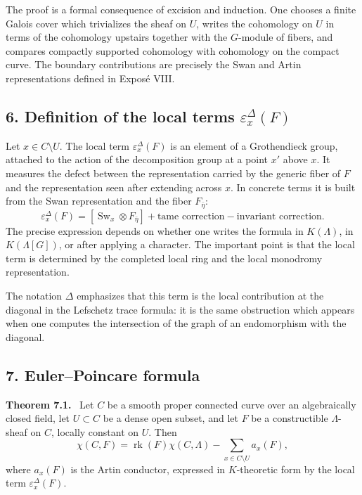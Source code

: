 \documentclass[14pt]{extarticle}
\newcommand{\Sw}{\operatorname{Sw}}
\newenvironment{statement}[1]{\par\medskip\noindent\textbf{#1.}\ }{\par\medskip}
\begin{document}
The proof is a formal consequence of excision and induction. One chooses a finite Galois cover which trivializes the sheaf on $U$, writes the cohomology on $U$ in terms of the cohomology upstairs together with the $G$-module of fibers, and compares compactly supported cohomology with cohomology on the compact curve. The boundary contributions are precisely the Swan and Artin representations defined in Expos\'e VIII.

\subsection*{6. Definition of the local terms $\varepsilon_x^\Delta(F)$}

Let $x\in C\setminus U$. The local term $\varepsilon_x^\Delta(F)$ is an element of a Grothendieck group, attached to the action of the decomposition group at a point $x'$ above $x$. It measures the defect between the representation carried by the generic fiber of $F$ and the representation seen after extending across $x$. In concrete terms it is built from the Swan representation and the fiber $F_{\bar\eta}$:
\[
   \varepsilon_x^\Delta(F)
      = [\Sw_x\otimes F_{\bar\eta}]+\text{tame correction}-\text{invariant correction}.
\]
The precise expression depends on whether one writes the formula in $K(\Lambda)$, in $K(\Lambda[G])$, or after applying a character. The important point is that the local term is determined by the completed local ring and the local monodromy representation.

The notation $\Delta$ emphasizes that this term is the local contribution at the diagonal in the Lefschetz trace formula: it is the same obstruction which appears when one computes the intersection of the graph of an endomorphism with the diagonal.

\subsection*{7. Euler--Poincare formula}

\begin{statement}{Theorem 7.1}
Let $C$ be a smooth proper connected curve over an algebraically closed field, let $U\subset C$ be a dense open subset, and let $F$ be a constructible $\Lambda$-sheaf on $C$, locally constant on $U$. Then
\[
   \chi(C,F)=\operatorname{rk}(F)\chi(C,\Lambda)
      -\sum_{x\in C\setminus U} a_x(F),
\]
where $a_x(F)$ is the Artin conductor, expressed in $K$-theoretic form by the local term $\varepsilon_x^\Delta(F)$.
\end{statement}
\end{document}

